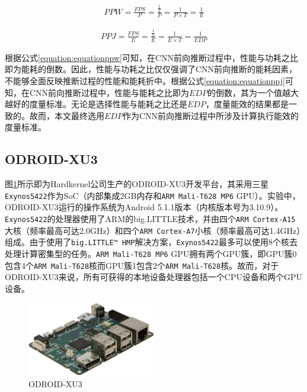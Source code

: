 \begin{equation}
     \label{equation:equationppw}
     \begin{aligned}
        PPW = \frac{FPS}{P}
        = \frac{\frac{1}{T}}{P}
        = \frac{1}{P \times T}
        = \frac{1}{E}
     \end{aligned}
\end{equation}

\begin{equation}
     \label{equation:equationppj}
     \begin{aligned}
        PPJ = \frac{FPS}{E}
        = \frac{\frac{1}{T}}{E}
        = \frac{1}{E \times T}
        = \frac{1}{EDP}
     \end{aligned}
\end{equation}

根据公式\ref{equation:equationppw}可知，在CNN前向推断过程中，性能与功耗之比即为能耗的倒数。因此，性能与功耗之比仅仅强调了CNN前向推断的能耗因素，不能够全面反映推断过程的性能和能耗折中。根据公式\ref{equation:equationppj}可知，在CNN前向推断过程中，性能与能耗之比即为$EDP$的倒数，其为一个值越大越好的度量标准。无论是选择性能与能耗之比还是$EDP$，度量能效的结果都是一致的。故而，本文最终选用$EDP$作为CNN前向推断过程中所涉及计算执行能效的度量标准。

\subsection{ODROID-XU3}
\label{chapter:chapter2-5-1}
图\ref{figure:figureodroid}所示即为Hardkernel公司生产的ODROID-XU3开发平台，其采用三星\texttt{Exynos5422}作为SoC（内部集成2GB内存和\texttt{ARM Mali-T628 MP6} GPU）。实验中，ODROID-XU3运行的操作系统为Android 5.1.1版本（内核版本号为3.10.9）。\texttt{Exynos5422}的处理器使用了ARM的big.LITTLE\cite{chung2012heterogeneous}技术，并由四个\texttt{ARM Cortex-A15}大核（频率最高可达2.0GHz）和四个\texttt{ARM Cortex-A7}小核（频率最高可达1.4GHz）组成。由于使用了\texttt{big.LITTLE™ HMP}解决方案，\texttt{Exynos5422}最多可以使用8个核去处理计算密集型的任务。\texttt{ARM Mali-T628 MP6} GPU拥有两个GPU簇，即GPU簇0包含4个\texttt{ARM Mali-T628}核而GPU簇1包含2个\texttt{ARM Mali-T628}核\cite{lokhmotov2015gemmbench}。故而，对于ODROID-XU3来说，所有可获得的本地设备处理器包括一个CPU设备和两个GPU设备\label{chapter:chapter1-1}。

\begin{figure}[htbp]
    \begin{center}
    \includegraphics[width=0.5\textwidth]{figures/odroid.pdf}
    \end{center}
    \caption{ODROID-XU3}\label{figure:figureodroid}
\end{figure}

